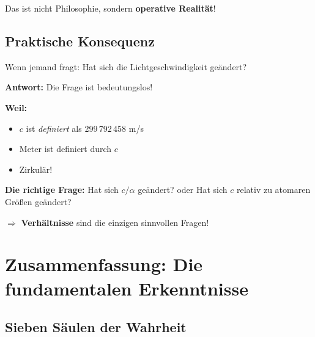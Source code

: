 Das ist nicht Philosophie, sondern \textbf{operative Realität}!

\subsection{Praktische Konsequenz}

Wenn jemand fragt: Hat sich die Lichtgeschwindigkeit geändert?

\textbf{Antwort:} Die Frage ist bedeutungslos!

\textbf{Weil:}
\begin{itemize}[nosep]
	\item $c$ ist \textit{definiert} als 299\,792\,458 m/s
	\item Meter ist definiert durch $c$
	\item Zirkulär!
\end{itemize}

\textbf{Die richtige Frage:} Hat sich $c/\alpha$ geändert? oder Hat sich $c$ relativ zu atomaren Größen geändert?

$\Rightarrow$ \textbf{Verhältnisse} sind die einzigen sinnvollen Fragen!

\section{Zusammenfassung: Die fundamentalen Erkenntnisse}

\subsection{Sieben Säulen der Wahrheit}

